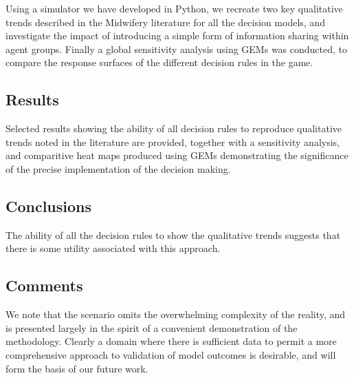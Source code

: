 Using a simulator we have developed in Python, we recreate two key qualitative trends described in the Midwifery literature for all the decision models, and investigate the impact of introducing a simple form of information sharing within agent groups.
Finally a global sensitivity analysis using \acp{GEM} was conducted, to compare the response surfaces of the different decision rules in the game.

\subsection*{Results} 

Selected results showing the ability of all decision rules to reproduce qualitative trends noted in the literature are provided, together with a sensitivity analysis, and comparitive heat maps produced using \acp{GEM} demonstrating the significance of the precise implementation of the decision making.

\subsection*{Conclusions}


The ability of all the decision rules to show the qualitative trends suggests that there is some utility associated with this approach.  

\subsection*{Comments} 


We note that the scenario omits the overwhelming complexity of the reality, and is presented largely in the spirit of a convenient demonstration of the methodology. Clearly a domain where there is sufficient data to permit a more comprehensive approach to validation of model outcomes is desirable, and will form the basis of our future work.